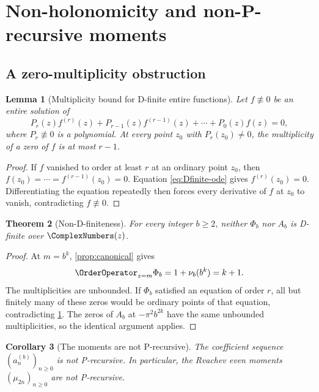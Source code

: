 \documentclass[11pt]{article}
\newtheorem{theorem}{Theorem}[section]
\newtheorem{corollary}[theorem]{Corollary}
\newtheorem{lemma}[theorem]{Lemma}
\theoremstyle{definition}
\theoremstyle{remark}
\begin{document}
\section{Non-holonomicity and non-P-recursive moments}

\subsection{A zero-multiplicity obstruction}

\begin{lemma}[Multiplicity bound for D-finite entire functions]\label{lem:Dfinite-multiplicity}
Let \(f\not\equiv0\) be an entire solution of
\begin{equation}\label{eq:Dfinite-ode}
  P_r(z)f^{(r)}(z)+P_{r-1}(z)f^{(r-1)}(z)+\cdots+P_0(z)f(z)=0,
\end{equation}
where \(P_r\not\equiv0\) is a polynomial.  At every point
\(z_0\) with \(P_r(z_0)\ne0\), the multiplicity of a zero of \(f\) is at most \(r-1\).
\end{lemma}

\begin{proof}
If \(f\) vanished to order at least \(r\) at an ordinary point \(z_0\), then
\(f(z_0)=\cdots=f^{(r-1)}(z_0)=0\).  Equation \eqref{eq:Dfinite-ode} gives
\(f^{(r)}(z_0)=0\).  Differentiating the equation repeatedly then forces every derivative of \(f\) at \(z_0\) to vanish, contradicting \(f\not\equiv0\).
\end{proof}

\begin{theorem}[Non-D-finiteness]\label{thm:nonDfinite}
For every integer \(b\ge2\), neither \(\Phi_b\) nor \(A_b\) is D-finite over \(\ComplexNumbers(z)\).
\end{theorem}

\begin{proof}
At \(m=b^k\), \cref{prop:canonical} gives
\[
  \OrderOperator_{z=m}\Phi_b=1+\nu_b(b^k)=k+1.
\]
The multiplicities are unbounded.  If \(\Phi_b\) satisfied an equation of order \(r\), all but finitely many of these zeros would be ordinary points of that equation, contradicting \cref{lem:Dfinite-multiplicity}.  The zeros of \(A_b\) at
\(-\pi^2b^{2k}\) have the same unbounded multiplicities, so the identical argument applies.
\end{proof}

\begin{corollary}[The moments are not P-recursive]\label{cor:notPrecursive}
The coefficient sequence \((a_n^{(b)})_{n\ge0}\) is not P-recursive.  In particular, the Rvachev even moments \((\mu_{2n})_{n\ge0}\) are not P-recursive.
\end{corollary}
\end{document}
